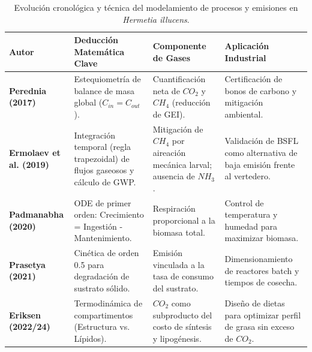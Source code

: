 \documentclass{article}
\begin{document}
\begin{table}[h!]
\centering
\renewcommand{\arraystretch}{1.5}
\begin{tabularx}{\textwidth}{@{} l >{\raggedright\arraybackslash}X >{\raggedright\arraybackslash}X >{\raggedright\arraybackslash}X @{}}
\toprule
\textbf{Autor} & \textbf{Deducción Matemática Clave} & \textbf{Componente de Gases} & \textbf{Aplicación Industrial} \\ \midrule

\textbf{Perednia (2017)} & 
Estequiometría de balance de masa global ($C_{in} = C_{out}$). & 
Cuantificación neta de $CO_2$ y $CH_4$ (reducción de GEI). & 
Certificación de bonos de carbono y mitigación ambiental. \\

\textbf{Ermolaev et al. (2019)} & 
Integración temporal (regla trapezoidal) de flujos gaseosos y cálculo de GWP. & 
Mitigación de $CH_4$ por aireación mecánica larval; ausencia de $NH_3$. & 
Validación de BSFL como alternativa de baja emisión frente al vertedero. \\

\textbf{Padmanabha (2020)} & 
ODE de primer orden: Crecimiento = Ingestión - Mantenimiento. & 
Respiración proporcional a la biomasa total. & 
Control de temperatura y humedad para maximizar biomasa. \\

\textbf{Prasetya (2021)} & 
Cinética de orden 0.5 para degradación de sustrato sólido. & 
Emisión vinculada a la tasa de consumo del sustrato. & 
Dimensionamiento de reactores batch y tiempos de cosecha. \\

\textbf{Eriksen (2022/24)} & 
Termodinámica de compartimentos (Estructura vs. Lípidos). & 
$CO_2$ como subproducto del costo de síntesis y lipogénesis. & 
Diseño de dietas para optimizar perfil de grasa sin exceso de $CO_2$. \\ 

\bottomrule
\end{tabularx}
\caption{Evolución cronológica y técnica del modelamiento de procesos y emisiones en \textit{Hermetia illucens}.}
\end{table}
\end{document}
